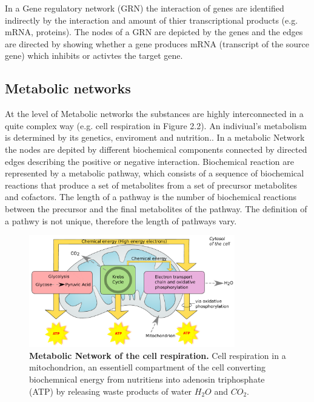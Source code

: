 In a Gene regulatory network (\gls{GRN}) the interaction of genes are identified indirectly by the interaction and amount of thier transcriptional products (e.g. mRNA, proteins). %
The nodes of a GRN are depicted by the genes and the edges are directed by showing whether a gene produces mRNA (transcript of the source gene) which inhibits or activtes the target gene. %


\subsection*{Metabolic networks}

At the level of Metabolic networks the substances are highly interconnected in a quite complex way (e.g. cell respiration in Figure 2.2). An indiviual's metabolism is determined by its genetics, enviroment and nutrition.\citep{8}. In a metabolic Network the nodes are depited by different biochemical components connected by directed edges describing the positive or negative interaction. Biochemical reaction are represented by a metabolic pathway, which consists of a sequence of biochemical reactions that produce a set of metabolites from a set of precursor metabolites and cofactors. The length of a pathway is the number of biochemical reactions between the precursor and the final metabolites of the pathway. The definition of a pathwy is not unique, therefore the length of pathways vary. \citep{9}

\begin{figure}[H]
\centering
\captionsetup{width=.8\linewidth}
\includegraphics[width=0.8\textwidth]{./Bilder/metabolic.pdf}
\caption[Metabolic Network]{\textbf{Metabolic Network of the cell respiration. } Cell respiration in a mitochondrion, an essentiell compartment of the cell converting biochemnical energy from nutritiens into adenosin triphosphate (\gls{ATP}) by releasing waste products of water $H_{2}O$ and $CO_{2}$.}
\label{fig:Fig.3.}
\end{figure} 


